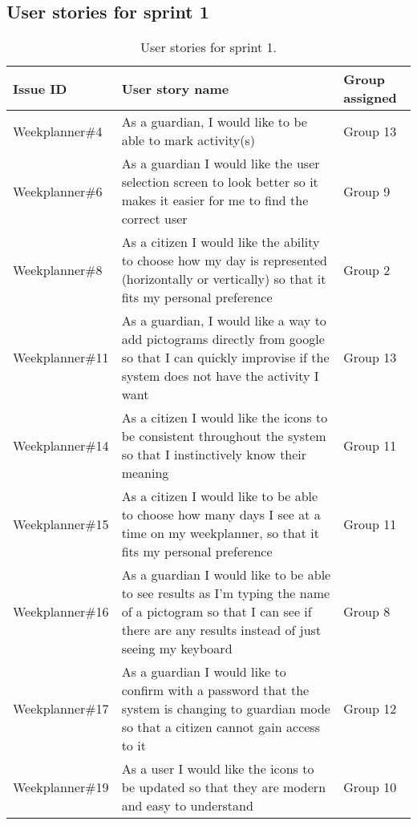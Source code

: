 \subsection{User stories for sprint 1}

\begin{table}[!ht]
    \begin{tabular}{|p{2.8cm}|p{8cm}|p{2cm}|}
    \hline
    Issue ID        & User story name                                                                                                                                                          & Group assigned       \\ \hline
    Weekplanner\#4  & As a guardian, I would like to be able to mark activity(s)                                                                                                               & Group 13             \\ \hline
    Weekplanner\#6  & As a guardian I would like the user selection screen to look better so it makes it easier for me to find the correct user                                                & Group 9              \\ \hline
    Weekplanner\#8  & As a citizen I would like the ability to choose how my day is represented (horizontally or vertically) so that it fits my personal preference                            & Group 2              \\ \hline
    Weekplanner\#11 & As a guardian, I would like a way to add pictograms directly from google so that I can quickly improvise if the system does not have the activity I want                 & Group 13             \\ \hline
    Weekplanner\#14 & As a citizen I would like the icons to be consistent throughout the system so that I instinctively know their meaning                                                    & Group 11             \\ \hline
    Weekplanner\#15 & As a citizen I would like to be able to choose how many days I see at a time on my weekplanner, so that it fits my personal preference                                   & Group 11             \\ \hline
    Weekplanner\#16 & As a guardian I would like to be able to see results as I'm typing the name of a pictogram so that I can see if there are any results instead of just seeing my keyboard & Group 8              \\ \hline
    Weekplanner\#17 & As a guardian I would like to confirm with a password that the system is changing to guardian mode so that a citizen cannot gain access to it                            & Group 12             \\ \hline
    Weekplanner\#19 & As a user I would like the icons to be updated so that they are modern and easy to understand                                                                            & Group 10             \\ \hline
    \end{tabular}
    \caption{User stories for sprint 1.}
\end{table}


